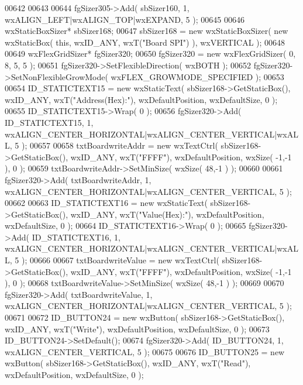 \begin{DoxyCode}
00642     
00643     
00644     fgSizer305->Add( sbSizer160, 1, wxALIGN\_LEFT|wxALIGN\_TOP|wxEXPAND, 5 );
00645     
00646     wxStaticBoxSizer* sbSizer168;
00647     sbSizer168 = \textcolor{keyword}{new} wxStaticBoxSizer( \textcolor{keyword}{new} wxStaticBox( \textcolor{keyword}{this}, wxID\_ANY, wxT(\textcolor{stringliteral}{"Board SPI"}) ), wxVERTICAL );
00648     
00649     wxFlexGridSizer* fgSizer320;
00650     fgSizer320 = \textcolor{keyword}{new} wxFlexGridSizer( 0, 8, 5, 5 );
00651     fgSizer320->SetFlexibleDirection( wxBOTH );
00652     fgSizer320->SetNonFlexibleGrowMode( wxFLEX\_GROWMODE\_SPECIFIED );
00653     
00654     ID_STATICTEXT15 = \textcolor{keyword}{new} wxStaticText( sbSizer168->GetStaticBox(), wxID\_ANY, wxT(\textcolor{stringliteral}{"Address(Hex):"}), 
      wxDefaultPosition, wxDefaultSize, 0 );
00655     ID_STATICTEXT15->Wrap( 0 );
00656     fgSizer320->Add( ID_STATICTEXT15, 1, wxALIGN\_CENTER\_HORIZONTAL|wxALIGN\_CENTER\_VERTICAL|wxALL, 5 );
00657     
00658     txtBoardwriteAddr = \textcolor{keyword}{new} wxTextCtrl( sbSizer168->GetStaticBox(), wxID\_ANY, wxT(\textcolor{stringliteral}{"FFFF"}), 
      wxDefaultPosition, wxSize( -1,-1 ), 0 );
00659     txtBoardwriteAddr->SetMinSize( wxSize( 48,-1 ) );
00660     
00661     fgSizer320->Add( txtBoardwriteAddr, 1, wxALIGN\_CENTER\_HORIZONTAL|wxALIGN\_CENTER\_VERTICAL, 5 );
00662     
00663     ID_STATICTEXT16 = \textcolor{keyword}{new} wxStaticText( sbSizer168->GetStaticBox(), wxID\_ANY, wxT(\textcolor{stringliteral}{"Value(Hex):"}), 
      wxDefaultPosition, wxDefaultSize, 0 );
00664     ID_STATICTEXT16->Wrap( 0 );
00665     fgSizer320->Add( ID_STATICTEXT16, 1, wxALIGN\_CENTER\_HORIZONTAL|wxALIGN\_CENTER\_VERTICAL|wxALL, 5 );
00666     
00667     txtBoardwriteValue = \textcolor{keyword}{new} wxTextCtrl( sbSizer168->GetStaticBox(), wxID\_ANY, wxT(\textcolor{stringliteral}{"FFFF"}), 
      wxDefaultPosition, wxSize( -1,-1 ), 0 );
00668     txtBoardwriteValue->SetMinSize( wxSize( 48,-1 ) );
00669     
00670     fgSizer320->Add( txtBoardwriteValue, 1, wxALIGN\_CENTER\_HORIZONTAL|wxALIGN\_CENTER\_VERTICAL, 5 );
00671     
00672     ID_BUTTON24 = \textcolor{keyword}{new} wxButton( sbSizer168->GetStaticBox(), wxID\_ANY, wxT(\textcolor{stringliteral}{"Write"}), wxDefaultPosition, 
      wxDefaultSize, 0 );
00673     ID_BUTTON24->SetDefault(); 
00674     fgSizer320->Add( ID_BUTTON24, 1, wxALIGN\_CENTER\_VERTICAL, 5 );
00675     
00676     ID_BUTTON25 = \textcolor{keyword}{new} wxButton( sbSizer168->GetStaticBox(), wxID\_ANY, wxT(\textcolor{stringliteral}{"Read"}), wxDefaultPosition, 
      wxDefaultSize, 0 );

\end{DoxyCode}
